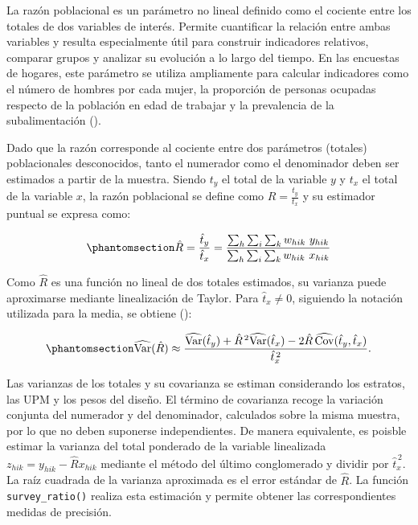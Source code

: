 \documentclass[
  spanish,
  11pt,
  letterpaper,
  oneside,
  open=any]{scrbook}
\begin{document}
La razón poblacional es un parámetro no lineal definido como el cociente
entre los totales de dos variables de interés. Permite cuantificar la
relación entre ambas variables y resulta especialmente útil para
construir indicadores relativos, comparar grupos y analizar su evolución
a lo largo del tiempo. En las encuestas de hogares, este parámetro se
utiliza ampliamente para calcular indicadores como el número de hombres
por cada mujer, la proporción de personas ocupadas respecto de la
población en edad de trabajar y la prevalencia de la subalimentación
().

Dado que la razón corresponde al cociente entre dos parámetros (totales)
poblacionales desconocidos, tanto el numerador como el denominador deben
ser estimados a partir de la muestra. Siendo \(t_y\) el total de la
variable \(y\) y \(t_x\) el total de la variable \(x\), la razón
poblacional se define como \(R = \frac{t_y}{t_x}\) y su estimador
puntual se expresa como:

\begin{equation}\protect\phantomsection\label{eq-estimador-razon}{
\hat{R} = \frac{\hat{t}_y}{\hat{t}_x}
= \frac{\sum_{h}\sum_{i}\sum_{k} w_{hik} \ y_{hik}}
       {\sum_{h}\sum_{i}\sum_{k} w_{hik} \ x_{hik}}
}\end{equation}

Como \(\hat{R}\) es una función no lineal de dos totales estimados, su
varianza puede aproximarse mediante linealización de Taylor. Para
\(\hat{t}_x\ne 0\), siguiendo la notación utilizada para la media, se
obtiene ():

\begin{equation}\protect\phantomsection\label{eq-varianza-razon}{
\widehat{\operatorname{Var}}(\hat{R})
\approx
\frac{\widehat{\operatorname{Var}}(\hat{t}_y)
+\hat{R}^{\,2}\widehat{\operatorname{Var}}(\hat{t}_x)
-2\hat{R}\,\widehat{\operatorname{Cov}}(\hat{t}_y,\hat{t}_x)}
{\hat{t}_x^{\,2}}.
}\end{equation}

Las varianzas de los totales y su covarianza se estiman considerando los
estratos, las UPM y los pesos del diseño. El término de covarianza
recoge la variación conjunta del numerador y del denominador, calculados
sobre la misma muestra, por lo que no deben suponerse independientes. De
manera equivalente, es poisble estimar la varianza del total ponderado
de la variable linealizada \(z_{hik}=y_{hik}-\hat{R}x_{hik}\) mediante
el método del último conglomerado y dividir por \(\hat{t}_x^{\,2}\). La
raíz cuadrada de la varianza aproximada es el error estándar de
\(\hat{R}\). La función \texttt{survey\_ratio()} realiza esta estimación
y permite obtener las correspondientes medidas de precisión.
\end{document}
